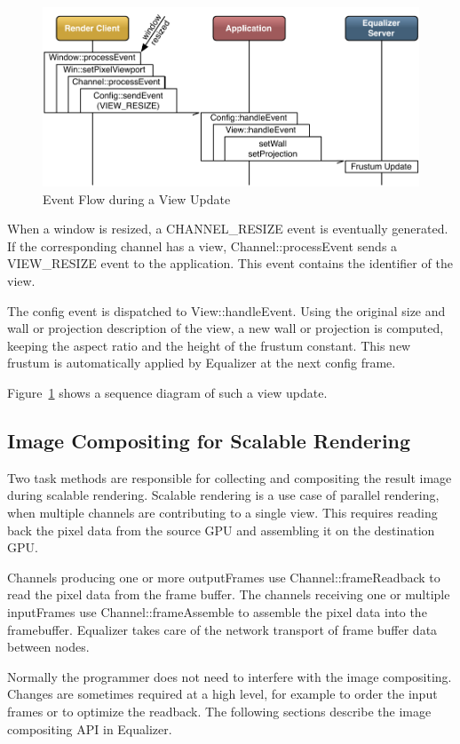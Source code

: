 \documentclass[10pt,a4]{scrartcl}
\newcommand{\fig}[1]{Figure~\ref{#1}}
\begin{document}
\begin{figure}
  \includegraphics[width=.618\textwidth]{images/viewUpdate.pdf}
  {\caption{\label{fViewUpdate}Event Flow during a View Update}}
\end{figure}
When a window is resized, a \textsf{CHANNEL\_RESIZE} event is eventually
generated. If the corresponding channel has a view,
\textsf{Channel::processEvent} sends a \textsf{VIEW\_RESIZE} event to
the application. This event contains the identifier of the view. 

The config event is dispatched to \textsf{View::handleEvent}. Using the original
size and wall or projection description of the view, a new wall or projection is
computed, keeping the aspect ratio and the height of the frustum constant. This
new frustum is automatically applied by Equalizer at the next config frame.

\fig{fViewUpdate} shows a sequence diagram of such a view update.


\subsection{\label{sCompositing}Image Compositing for Scalable Rendering}

Two task methods are responsible for collecting and compositing the
result image during scalable rendering. Scalable rendering is a use case
of parallel rendering, when multiple channels are contributing to a single
view. This requires reading back the pixel data from the source GPU and
assembling it on the destination GPU.

Channels producing one or more \textsf{outputFrame}s use
\textsf{Channel::frame\-Read\-back} to read the pixel data from the frame
buffer. The channels receiving one or multiple \textsf{inputFrame}s use
\textsf{Channel::frameAssemb\-le} to assemble the pixel data into the
framebuffer. Equalizer takes care of the network transport of frame buffer data
between nodes.

Normally the programmer does not need to interfere with the image
compositing. Changes are sometimes required at a high level, for example
to order the input frames or to optimize the readback. The following
sections describe the image compositing API in Equalizer.
\end{document}
